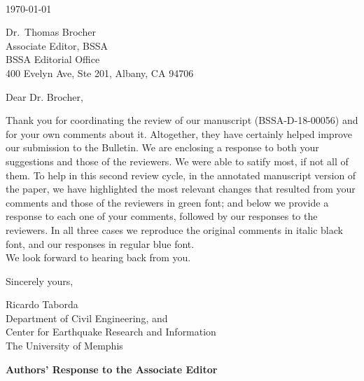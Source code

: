 \documentclass{article}
\begin{document}

\thispagestyle{empty}
\setcounter{page}{0}

~

\vspace{6em}
\noindent\today

\vspace{5em}
\noindent
Dr.~Thomas Brocher\\
Associate Editor, BSSA\\
BSSA Editorial Office\\
400 Evelyn Ave, Ste 201, Albany, CA 94706

\vspace{4em}
\noindent
Dear Dr. Brocher,

\vspace{1em}
\noindent
Thank you for coordinating the review of our manuscript (BSSA-D-18-00056) and for your own comments about it. Altogether, they have certainly helped improve our submission to the Bulletin. We are enclosing a response to both your suggestions and those of the reviewers. We were able to satify most, if not all of them. To help in this second review cycle, in the annotated manuscript version of the paper, we have highlighted the most relevant changes that resulted from your comments and those of the reviewers in green font; and below we provide a response to each one of your comments, followed by our responses to the reviewers. In all three cases we reproduce the original comments in italic black font, and our responses in regular blue font.\\

\noindent
We look forward to hearing back from you.

\vspace{2em}
\noindent
Sincerely yours,


\vspace{5em}
\noindent
Ricardo Taborda\\
Department of Civil Engineering, and\\
Center for Earthquake Research and Information\\
The University of Memphis

\newpage
\begin{center}
	\bf
	\large
	Authors' Response to the Associate Editor
\end{center}
\end{document}
